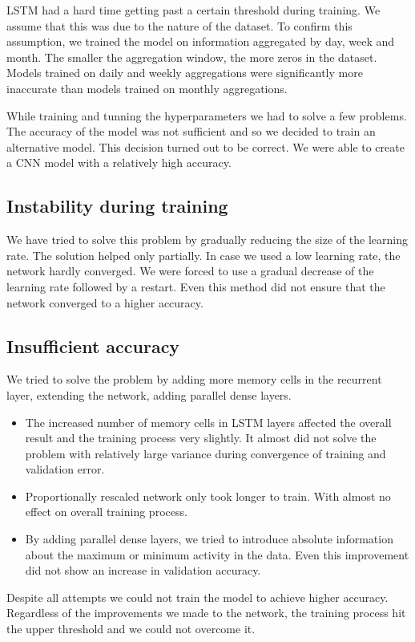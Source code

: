 \documentclass[thesis=M,english]{FITthesis}[2019/12/23]
\begin{document}
LSTM had a hard time getting past a certain threshold during training. We assume that this was due to the nature of the dataset. To confirm this assumption, we trained the model on information aggregated by day, week and month. The smaller the aggregation window, the more zeros in the dataset. Models trained on daily and weekly aggregations were significantly more inaccurate than models trained on monthly aggregations.

While training and tunning the hyperparameters we had to solve a few problems. The accuracy of the model was not sufficient and so we decided to train an alternative model. This decision turned out to be correct. We were able to create a CNN model with a relatively high accuracy.

\subsection{Instability during training}
We have tried to solve this problem by gradually reducing the size of the learning rate. The solution helped only partially. In case we used a low learning rate, the network hardly converged. We were forced to use a gradual decrease of the learning rate followed by a restart. Even this method did not ensure that the network converged to a higher accuracy.
 

\subsection{Insufficient accuracy}
We tried to solve the problem by adding more memory cells in the recurrent layer, extending the network, adding parallel dense layers.
\begin{itemize}
		\item The increased number of memory cells in LSTM layers affected the overall result and the training process very slightly. It almost did not solve the problem with relatively large variance during convergence of training and validation error.
		\item Proportionally rescaled network only took longer to train. With almost no effect on overall training process.
		\item By adding parallel dense layers, we tried to introduce absolute information about the maximum or minimum activity in the data. Even this improvement did not show an increase in validation accuracy.
	\end{itemize}

Despite all attempts we could not train the model to achieve higher accuracy. Regardless of the improvements we made to the network, the training process hit the upper threshold and we could not overcome it. 
\end{document}
